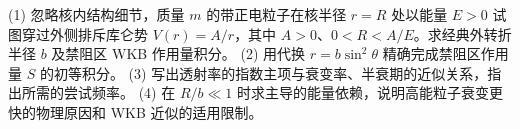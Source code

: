 (1) 忽略核内结构细节，质量 \(m\) 的带正电粒子在核半径 \(r=R\) 处以能量 \(E>0\) 试图穿过外侧排斥库仑势 \(V(r)=A/r\)，其中 \(A>0\)、\(0<R<A/E\)。求经典外转折半径 \(b\) 及禁阻区 WKB 作用量积分。
(2) 用代换 \(r=b\sin^2\theta\) 精确完成禁阻区作用量 \(S\) 的初等积分。
(3) 写出透射率的指数主项与衰变率、半衰期的近似关系，指出所需的尝试频率。
(4) 在 \(R/b\ll1\) 时求主导的能量依赖，说明高能粒子衰变更快的物理原因和 WKB 近似的适用限制。
